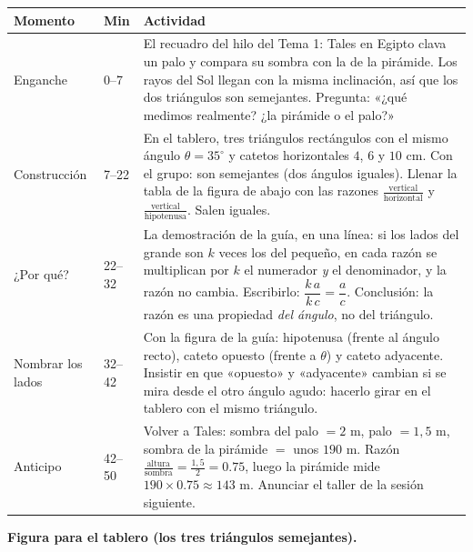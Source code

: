 \documentclass[11pt]{article}
\begin{document}
\begin{center}
{\renewcommand{\arraystretch}{1.3}
\begin{tabularx}{\linewidth}{@{}l l X@{}}
  \toprule
  \textbf{Momento} & \textbf{Min} & \textbf{Actividad}\\
  \midrule
  Enganche & 0--7 & El recuadro del hilo del Tema 1: Tales en Egipto clava un palo y
    compara su sombra con la de la pirámide. Los rayos del Sol llegan con la misma
    inclinación, así que los dos triángulos son semejantes. Pregunta: «¿qué medimos
    realmente? ¿la pirámide o el palo?»\\
  Construcción & 7--22 & En el tablero, tres triángulos rectángulos con el mismo ángulo
    $\theta = 35^\circ$ y catetos horizontales $4$, $6$ y $10$ cm. Con el grupo: son
    semejantes (dos ángulos iguales). Llenar la tabla de la figura de abajo con las
    razones $\frac{\text{vertical}}{\text{horizontal}}$ y
    $\frac{\text{vertical}}{\text{hipotenusa}}$. Salen iguales.\\
  ¿Por qué? & 22--32 & La demostración de la guía, en una línea: si los lados del grande
    son $k$ veces los del pequeño, en cada razón se multiplican por $k$ el numerador
    \emph{y} el denominador, y la razón no cambia. Escribirlo:
    $\dfrac{k\,a}{k\,c} = \dfrac{a}{c}$. Conclusión: la razón es una propiedad
    \emph{del ángulo}, no del triángulo.\\
  Nombrar los lados & 32--42 & Con la figura de la guía: hipotenusa (frente al ángulo
    recto), cateto opuesto (frente a $\theta$) y cateto adyacente. Insistir en que
    «opuesto» y «adyacente» cambian si se mira desde el otro ángulo agudo: hacerlo girar
    en el tablero con el mismo triángulo.\\
  Anticipo & 42--50 & Volver a Tales: sombra del palo $=2$ m, palo $=1{,}5$ m, sombra de
    la pirámide $=$ unos $190$ m. Razón $\frac{\text{altura}}{\text{sombra}}
    = \frac{1{,}5}{2} = \num{0,75}$, luego la pirámide mide $190 \times \num{0,75}
    \approx 143$ m. Anunciar el taller de la sesión siguiente.\\
  \bottomrule
\end{tabularx}}
\end{center}

\textbf{Figura para el tablero (los tres triángulos semejantes).}
\end{document}
